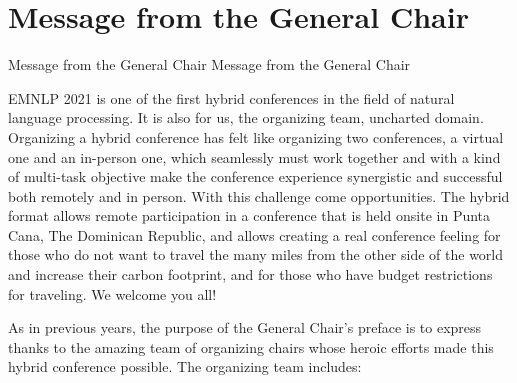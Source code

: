 \section{Message from the General Chair}\vspace{2em}
\setheaders%
    {Message from the General Chair}%
    {Message from the General Chair}
\thispagestyle{emptyheader}

\setlength{\parskip}{1ex}

EMNLP 2021 is one of the first hybrid conferences in the field of natural language processing. It is also for us, the organizing team, uncharted domain. Organizing a hybrid conference has felt like organizing two conferences, a virtual one and an in-person one, which seamlessly must work together and with a kind of multi-task objective make the conference experience synergistic and successful both remotely and in person. With this challenge come opportunities. The hybrid format allows remote participation in a conference that is held onsite in Punta Cana, The Dominican Republic, and allows creating a real conference feeling for those who do not want to travel the many miles from the other side of the world and increase their carbon footprint, and for those who have budget restrictions for traveling. We welcome you all!

As in previous years, the purpose of the General Chair’s preface is to express thanks to the amazing team of organizing chairs whose heroic efforts made this hybrid conference possible. The organizing team includes:


